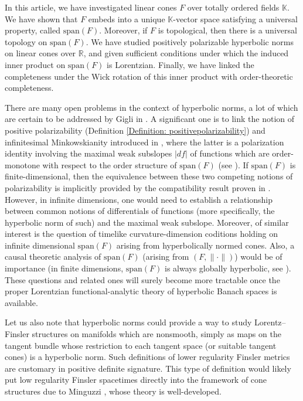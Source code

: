 \documentclass[a4paper,11pt]{article}
\numberwithin{equation}{section}
\theoremstyle{definition}
\theoremstyle{plain}
\newcommand{\R}{\mathbb R}
\newcommand{\spn}{\mathrm{span}}
\newcommand{\norm}[1]{\| #1\|}
\begin{document}
In this article, we have investigated linear cones $F$ over totally ordered fields $\mathbb{K}$. We have shown that $F$ embeds into a unique $\mathbb{K}$-vector space satisfying a universal property, called $\spn(F)$. Moreover, if $F$ is topological, then there is a universal topology on $\spn(F)$. We have studied positively polarizable hyperbolic norms on linear cones over $\R$, and given sufficient conditions under which the induced inner product on $\spn(F)$ is Lorentzian. Finally, we have linked the completeness under the Wick rotation of this inner product with order-theoretic completeness.

There are many open problems in the context of hyperbolic norms, a lot of which are certain to be addressed by Gigli in \cite{gigli2025hyperbolic2}. A significant one is to link the notion of positive polarizability (Definition \ref{Definition: positivepolarizability}) and infinitesimal Minkowskianity introduced in \cite[Def.\ 1.4]{beran2024nonlinear}, where the latter is a polarization identity involving the maximal weak subslopes $|df|$ of functions which are order-monotone with respect to the order structure of $\spn(F)$ (see \cite[Sec.\ 3.3]{beran2024nonlinear}). If $\spn(F)$ is finite-dimensional, then the equivalence between these two competing notions of polarizability is implicitly provided by the compatibility result proven in \cite[Thm.\ A.2]{beran2024nonlinear}. However, in infinite dimensions, one would need to establish a relationship between common notions of differentials of functions (more specifically, the hyperbolic norm of such) and the maximal weak subslope. Moreover, of similar interest is the question of timelike curvature-dimension coditions holding on infinite dimensional $\spn(F)$ arising from hyperbolically normed cones. Also, a causal theoretic analysis of $\spn(F)$ (arising from $(F,\norm{\cdot})$) would be of importance (in finite dimensions, $\spn(F)$ is always globally hyperbolic, see \cite[Prop.\ A.10]{beran2024nonlinear}). These questions and related ones will surely become more tractable once the proper Lorentzian functional-analytic theory of hyperbolic Banach spaces \cite{gigli2025hyperbolic2} is available.

Let us also note that hyperbolic norms could provide a way to study Lorentz--Finsler structures on manifolds which are nonsmooth, simply as maps on the tangent bundle whose restriction to each tangent space (or suitable tangent cones) is a hyperbolic norm. Such definitions of lower regularity Finsler metrics are customary in positive definite signature. This type of definition would likely put low regularity Finsler spacetimes directly into the framework of cone structures due to Minguzzi \cite{minguzzi2019causality}, whose theory is well-developed.
\end{document}
